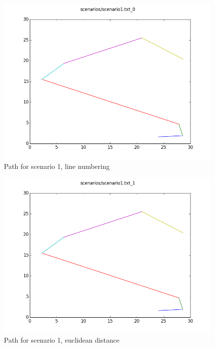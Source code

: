 \documentclass[paper=a4, fontsize=11pt]{scrartcl} %
\numberwithin{equation}{section} %
\numberwithin{figure}{section} %
\numberwithin{table}{section} %
\begin{document}
\begin{figure}[H]
	\centering
  	\includegraphics[width=1\textwidth]{results/1_0.png}
	\caption{Path for scenario 1, line numbering}
\end{figure}
\begin{figure}[H]
	\centering
  \includegraphics[width=1\textwidth]{results/1_1.png}
	\caption{Path for scenario 1, euclidean distance}
\end{figure}
\end{document}
